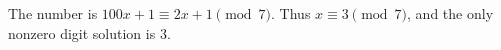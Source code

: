The number is $100x+1\equiv2x+1\pmod7$. Thus $x\equiv3\pmod7$, and the only nonzero digit solution is $\boxed3$.
